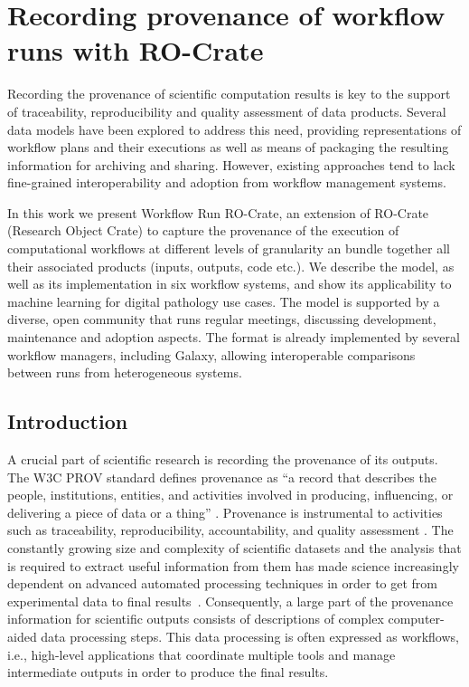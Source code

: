 \section{Recording provenance of workflow runs with RO-Crate}
\label{ch54:wrroc}

Recording the provenance of scientific computation results is
key to the support of traceability, reproducibility and quality
assessment of data products. Several data models have been explored to
address this need, providing representations of workflow plans and their
executions as well as means of packaging the resulting information for
archiving and sharing. However, existing approaches tend to lack fine-grained interoperability and adoption from workflow management systems. 

In this work we present
Workflow Run RO-Crate, an extension of RO-Crate (Research Object Crate)
to capture the provenance of the execution of computational workflows at
different levels of granularity an bundle together all their associated products (inputs, outputs, code etc.). We describe the model, as well as its
implementation in six workflow systems, and show its applicability to
machine learning for digital pathology use cases. The model is supported
by a diverse, open community that runs regular meetings, discussing
development, maintenance and adoption  aspects. The format is already implemented by
several workflow managers, including Galaxy, allowing interoperable
comparisons between runs from heterogeneous systems.


\subsection{Introduction}\label{ch54:introduction}

A crucial part of scientific research is recording the provenance of its outputs.
The W3C PROV standard defines provenance as ``a record that describes the people, institutions, entities, and activities involved in producing, influencing, or delivering a piece of data or a thing''
\cite{Moreau 2013}.
Provenance is instrumental to activities such as traceability, reproducibility, accountability, and quality assessment
\cite{Herschel 2017}.
The constantly growing size and complexity of scientific datasets and the analysis that is required to extract useful information from them has made science increasingly dependent on advanced automated processing techniques in order to get from experimental data to final results~\cite{Himanen 2019, Gauthier 2019, Huntingford 2019}.
Consequently, a large part of the provenance information for scientific outputs consists of descriptions of complex computer-aided data processing steps. This data processing is often expressed as workflows, i.e., high-level applications that coordinate multiple tools and manage intermediate outputs in order to produce the final results.

